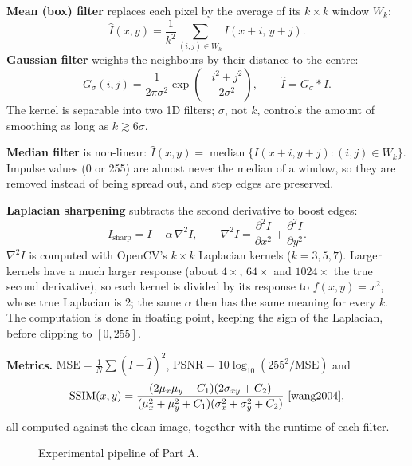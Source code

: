 \documentclass[a4paper,12pt]{article}
\begin{document}
\textbf{Mean (box) filter} replaces each pixel by the average of its $k\times k$ window $W_k$:
\begin{equation}
    \hat I(x,y)=\frac{1}{k^2}\sum_{(i,j)\in W_k} I(x+i,\,y+j).
\end{equation}
\textbf{Gaussian filter} weights the neighbours by their distance to the centre:
\begin{equation}
    G_\sigma(i,j)=\frac{1}{2\pi\sigma^2}\exp\!\left(-\frac{i^2+j^2}{2\sigma^2}\right),\qquad \hat I = G_\sigma * I .
\end{equation}
The kernel is separable into two 1D filters; $\sigma$, not $k$, controls the amount of smoothing as long as $k\gtrsim 6\sigma$.

\textbf{Median filter} is non-linear: $\hat I(x,y)=\operatorname{median}\{I(x+i,y+j) : (i,j)\in W_k\}$. Impulse values (0 or 255) are almost never the median of a window, so they are removed instead of being spread out, and step edges are preserved.

\textbf{Laplacian sharpening} subtracts the second derivative to boost edges:
\begin{equation}
    I_{\text{sharp}} = I - \alpha\,\nabla^2 I,\qquad \nabla^2 I=\frac{\partial^2 I}{\partial x^2}+\frac{\partial^2 I}{\partial y^2}.
\end{equation}
$\nabla^2 I$ is computed with OpenCV's $k\times k$ Laplacian kernels ($k=3,5,7$). Larger kernels have a much larger response (about $4\times$, $64\times$ and $1024\times$ the true second derivative), so each kernel is divided by its response to $f(x,y)=x^2$, whose true Laplacian is 2; the same $\alpha$ then has the same meaning for every $k$. The computation is done in floating point, keeping the sign of the Laplacian, before clipping to $[0,255]$.

\textbf{Metrics.} $\mathrm{MSE}=\frac{1}{N}\sum (I-\hat I)^2$, $\mathrm{PSNR}=10\log_{10}(255^2/\mathrm{MSE})$ and
\begin{equation}
\mathrm{SSIM}(x,y)=\frac{(2\mu_x\mu_y+C_1)(2\sigma_{xy}+C_2)}{(\mu_x^2+\mu_y^2+C_1)(\sigma_x^2+\sigma_y^2+C_2)}~\text{\cite{wang2004}},
\end{equation}
all computed against the clean image, together with the runtime of each filter.

\begin{figure}[H]
\centering
{}
\caption{Experimental pipeline of Part A.}
\end{figure}
\end{document}
